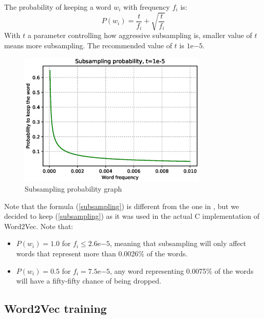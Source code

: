 The probability of keeping a word $w_i$ with frequency $f_i$ is:
\begin{equation}
    P(w_i) = \frac{t}{f_i} + \sqrt{\frac{t}{f_i}}
    \label{subsampling}
\end{equation}
With $t$ a parameter controlling how aggressive subsampling is, smaller value of $t$ means more subsampling. The recommended value of $t$ is $1\mathrm{e}{-5}$. 

\begin{figure}[H]
    \centering
    \includegraphics[width=0.8\textwidth]{Images/subsampling_prob.eps}
    \caption{Subsampling probability graph}
\end{figure}

Note that the formula (\ref{subsampling}) is different from the one in \cite{word2vec2}, but we decided to keep (\ref{subsampling}) as it was used in the actual C implementation of Word2Vec. Note that:
\begin{itemize}
    \item $P(w_i) = 1.0$ for $f_i\leq2.6\mathrm{e}{-5}$, meaning that subsampling will only affect words that represent more than 0.0026\% of the words.
    \item $P(w_i) = 0.5$ for $f_i=7.5\mathrm{e}{-5}$, any word representing 0.0075\% of the words will have a fifty-fifty chance of being dropped.
\end{itemize}

\subsection{Word2Vec training}







